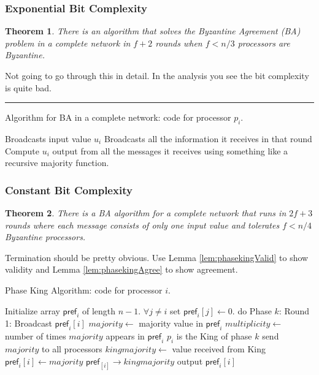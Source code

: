 \documentclass[twoside]{article}
\newcounter{lecnum}
\newtheorem{theorem}{Theorem}[lecnum]
\newenvironment{proof}{{\bf Proof:}}{\hfill\rule{2mm}{2mm}}
\newcommand\pref{\mathsf{pref}}
\begin{document}
\subsubsection{Exponential Bit Complexity}

\begin{theorem}
There is an algorithm that solves the Byzantine Agreement (BA) problem in a complete network in $f+2$ rounds when $f < n/3$ processors are Byzantine.
\end{theorem}
\begin{proof}
Not going to go through this in detail. In the analysis you see the bit complexity is quite bad.
\end{proof}

\begin{algorithm}
	\caption{Algorithm for BA in a complete network: code for processor $p_i$.}
    \label{pseudocode:BAExpBit}
    \begin{algorithmic}[1]
    \State Broadcasts input value $u_i$
    	\State Broadcasts all the information it receives in that round
    \EndFor
    \State Compute $u_i$ output from all the messages it receives using something like a recursive majority function.
    \end{algorithmic}
\end{algorithm}

\subsubsection{Constant Bit Complexity}
\begin{theorem}
There is a BA algorithm for a complete network that runs in $2f + 3$ rounds where each message consists of only one input value and tolerates $f < n/4$ Byzantine processors.
\end{theorem}
Termination should be pretty obvious. Use Lemma \ref{lem:phasekingValid} to show validity and Lemma \ref{lem:phasekingAgree} to show agreement.

\begin{algorithm}
	\caption{Phase King Algorithm: code for processor $i$.}
    \label{pseudocode:BAConstBit}
    \begin{algorithmic}[1]
    \State Initialize array $\pref_i$ of length $n-1$.
    \State $\forall j \neq i$ set $\pref_i[j] \leftarrow 0$.
    	\State do Phase $k$:
    	\State Round 1:
    	\State Broadcast $\pref_i[i]$
    	\State $majority \leftarrow$ majority value in $\pref_i$
    	\State $multiplicity \leftarrow $ number of times $majority$ appears in $\pref_i$
    		\State $p_i$ is the King of phase $k$
    		\State send $majority$ to all processors
    	\Else
    		\State $kingmajority \leftarrow$ value received from King
    			\State $\pref_i[i] \leftarrow majority$
    		\Else
    			\State $\pref_[i] \rightarrow kingmajority$
    		\EndIf
    	\EndIf
    \EndFor
    \State output $\pref_i[i]$
    \end{algorithmic}
\end{algorithm}
\end{document}
